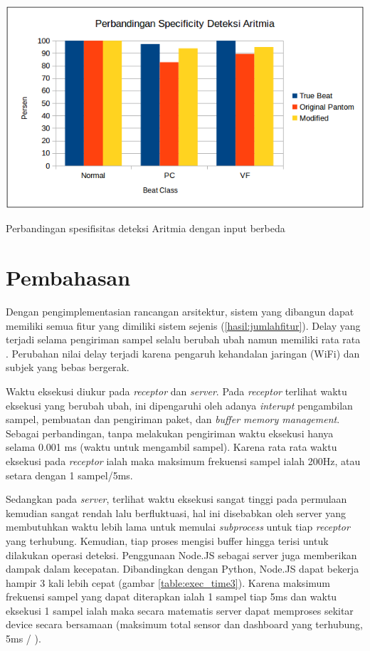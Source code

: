 \begin{table}[H]
	\centering
	\includegraphics[scale=0.7]{images/aritmia_sp.png}
	\caption{Perbandingan spesifisitas deteksi Aritmia dengan input berbeda}
	\label{fig:aritmia_specificity}
\end{table}

\section{Pembahasan}\label{bab4:pembahasan}
Dengan pengimplementasian rancangan arsitektur, sistem yang dibangun dapat memiliki semua fitur yang dimiliki sistem sejenis (\ref{hasil:jumlahfitur}). Delay yang terjadi selama pengiriman sampel selalu berubah ubah namun memiliki rata rata \delay. Perubahan nilai delay terjadi karena pengaruh kehandalan jaringan (WiFi) dan subjek yang bebas bergerak. 

Waktu eksekusi diukur pada \textit{receptor} dan \textit{server}. Pada \textit{receptor} terlihat waktu eksekusi yang berubah ubah, ini dipengaruhi oleh adanya \textit{interupt} pengambilan sampel, pembuatan dan pengiriman paket, dan \textit{buffer memory management}. Sebagai perbandingan, tanpa melakukan pengiriman waktu eksekusi hanya selama 0.001 ms (waktu untuk mengambil sampel). Karena rata rata waktu eksekusi pada \textit{receptor} ialah \exec maka maksimum frekuensi sampel ialah 200Hz, atau setara dengan 1 sampel/5ms. 

Sedangkan pada \textit{server}, terlihat waktu eksekusi sangat tinggi pada permulaan kemudian sangat rendah lalu berfluktuasi, hal ini disebabkan oleh server yang membutuhkan waktu lebih lama untuk memulai \textit{subprocess} untuk tiap \textit{receptor} yang terhubung. Kemudian, tiap proses mengisi buffer hingga terisi untuk dilakukan operasi deteksi. Penggunaan Node.JS sebagai server juga memberikan dampak dalam kecepatan. Dibandingkan dengan Python, Node.JS dapat bekerja hampir 3 kali lebih cepat (gambar \ref{table:exec_time3}). Karena maksimum frekuensi sampel yang dapat diterapkan ialah 1 sampel tiap 5ms dan waktu eksekusi 1 sampel ialah \execs maka secara matematis server dapat memproses sekitar \sensor device secara bersamaan (maksimum total sensor dan dashboard yang terhubung, 5ms / \execs).

